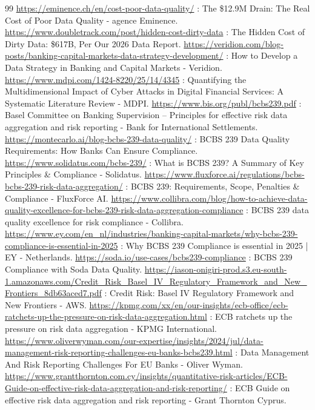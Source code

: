 \begin{thebibliography}{99}
     \url{https://eminence.ch/en/cost-poor-data-quality/} : The \$12.9M Drain: The Real Cost of Poor Data Quality - agence Eminence.
     \url{https://www.doubletrack.com/post/hidden-cost-dirty-data} : The Hidden Cost of Dirty Data: \$617B, Per Our 2026 Data Report.
     \url{https://veridion.com/blog-posts/banking-capital-markets-data-strategy-development/} : How to Develop a Data Strategy in Banking and Capital Markets - Veridion.
     \url{https://www.mdpi.com/1424-8220/25/14/4345} : Quantifying the Multidimensional Impact of Cyber Attacks in Digital Financial Services: A Systematic Literature Review - MDPI.
     \url{https://www.bis.org/publ/bcbs239.pdf} : Basel Committee on Banking Supervision – Principles for effective risk data aggregation and risk reporting - Bank for International Settlements.
     \url{https://montecarlo.ai/blog-bcbs-239-data-quality/} : BCBS 239 Data Quality Requirements: How Banks Can Ensure Compliance.
     \url{https://www.solidatus.com/bcbs-239/} : What is BCBS 239? A Summary of Key Principles \& Compliance - Solidatus.
     \url{https://www.fluxforce.ai/regulations/bcbs-bcbs-239-risk-data-aggregation/} : BCBS 239: Requirements, Scope, Penalties \& Compliance - FluxForce AI.
     \url{https://www.collibra.com/blog/how-to-achieve-data-quality-excellence-for-bcbs-239-risk-data-aggregation-compliance} : BCBS 239 data quality excellence for risk compliance - Collibra.
     \url{https://www.ey.com/en_nl/industries/banking-capital-markets/why-bcbs-239-compliance-is-essential-in-2025} : Why BCBS 239 Compliance is essential in 2025 | EY - Netherlands.
     \url{https://soda.io/use-cases/bcbs239-compliance} : BCBS 239 Compliance with Soda Data Quality.
     \url{https://iason-onigiri-prod.s3.eu-south-1.amazonaws.com/Credit_Risk_Basel_IV_Regulatory_Framework_and_New_Frontiers_8db63aced7.pdf} : Credit Risk: Basel IV Regulatory Framework and New Frontiers - AWS.
     \url{https://kpmg.com/xx/en/our-insights/ecb-office/ecb-ratchets-up-the-pressure-on-risk-data-aggregation.html} : ECB ratchets up the pressure on risk data aggregation - KPMG International.
     \url{https://www.oliverwyman.com/our-expertise/insights/2024/jul/data-management-risk-reporting-challenges-eu-banks-bcbs239.html} : Data Management And Risk Reporting Challenges For EU Banks - Oliver Wyman.
     \url{https://www.grantthornton.com.cy/insights/quantitative-risk-articles/ECB-Guide-on-effective-risk-data-aggregation-and-risk-reporting/} : ECB Guide on effective risk data aggregation and risk reporting - Grant Thornton Cyprus.

\end{thebibliography}
